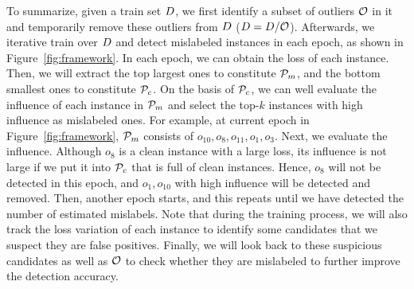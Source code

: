 
 To summarize, given a train set $D$, we first identify a subset of  outliers $\mathcal{O}$ in it and temporarily remove these outliers from $D$ (\ie $D = D/ \mathcal{O}$).
 Afterwards, we iterative train over $D$ and detect mislabeled instances in each epoch, as shown in Figure~\ref{fig:framework}. In each epoch, we can obtain the loss of each instance. Then, we will extract the top largest ones to constitute $\mathcal{P}_m$, and the bottom  smallest ones to constitute $\mathcal{P}_c$. On the basis of $\mathcal{P}_c$, we can well evaluate the influence of each instance in $\mathcal{P}_m$ and select the top-$k$ instances with high influence as mislabeled ones. For example, at current epoch in Figure~\ref{fig:framework}, $\mathcal{P}_m$ consists of $o_{10}, o_{8}, o_{11}, o_{1}, o_{3}$. Next, we evaluate the influence. Although $o_{8}$ is a clean instance with a large loss, its influence is not large if we put it into $\mathcal{P}_c$ that is full of clean instances. Hence, $o_{8}$ will not be detected in this epoch, and $o_{1},o_{10}$ with high influence will be detected and removed. Then, another epoch starts, and this repeats until we have detected the number of estimated mislabels. Note that during the training process, we will also track the loss variation of each instance to identify some candidates that we suspect they are false positives.
 Finally, we will look back to these suspicious candidates as well as  $\mathcal{O}$ to check whether they are mislabeled to further improve the detection accuracy.






